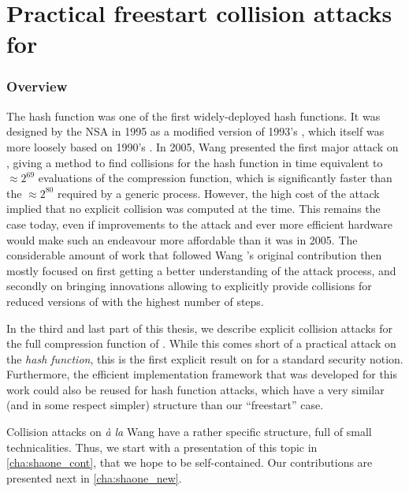 \part[Collisions explicites pour la fonction de compression de \shaone]
    {Practical freestart collision attacks for \shaone} 
\label{part:sha-1}

\section*{Overview}

The \shaone hash function was one of the first widely-deployed hash functions. It was designed by the NSA in 1995 as a modified version of 1993's \shazero, which itself
was more loosely based on 1990's \mdfour. In 2005, Wang \etal presented the first major attack on \shaone, giving a method to find collisions for the hash function
in time equivalent to $\approx 2^{69}$ evaluations of the compression function, which is significantly faster than the $\approx 2^{80}$ required by a generic process.
However, the high cost of the attack implied that no explicit collision was computed at the time. This remains the case today, even if improvements to the attack
and ever more efficient hardware would make such an endeavour more affordable than it was in 2005.
The considerable amount of work that followed Wang \etal's original contribution then mostly focused on first getting a better understanding of the attack process, and
secondly on bringing innovations allowing to explicitly provide collisions for reduced versions of \shaone with the highest number of steps. 

\bigskip

In the third and last part of this thesis, we describe explicit collision attacks for the full compression function of \shaone. While this comes short of a practical
attack on the \emph{hash function}, this is the first explicit result on \shaone for a standard security notion. Furthermore, the efficient implementation framework that was developed
for this work could also be reused for hash function attacks, which have a very similar (and in some respect simpler) structure than our ``freestart'' case.

Collision attacks on \shaone \emph{à la} Wang have a rather specific structure, full of small technicalities. Thus, we start with a presentation of this topic in \autoref{cha:shaone_cont},
that we hope to be self-contained. Our contributions are presented next in \autoref{cha:shaone_new}.

